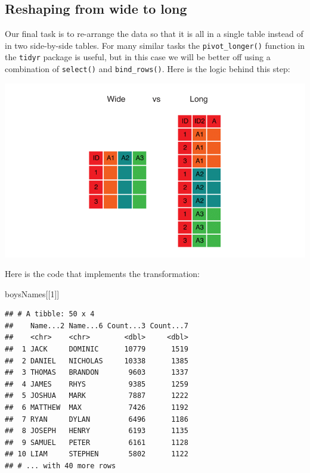 \documentclass[
]{book}
\newenvironment{Shaded}{\begin{snugshade}}{\end{snugshade}}
\newcommand{\DecValTok}[1]{\textcolor[rgb]{0.00,0.00,0.81}{#1}}
\newcommand{\NormalTok}[1]{#1}
\begin{document}
\hypertarget{reshaping-from-wide-to-long}{%
\subsection{Reshaping from wide to long}\label{reshaping-from-wide-to-long}}

Our final task is to re-arrange the data so that it is all in a single table instead of in two side-by-side tables. For many similar tasks the \texttt{pivot\_longer()} function in the \texttt{tidyr} package is useful, but in this case we will be better off using a combination of \texttt{select()} and \texttt{bind\_rows()}. Here is the logic behind this step:

\includegraphics{R/RDataWrangling/images/wide_vs_long.png}

Here is the code that implements the transformation:

\begin{Shaded}
\begin{Highlighting}[]
\NormalTok{boysNames[[}\DecValTok{1}\NormalTok{]]}
\end{Highlighting}
\end{Shaded}

\begin{verbatim}
## # A tibble: 50 x 4
##    Name...2 Name...6 Count...3 Count...7
##    <chr>    <chr>        <dbl>     <dbl>
##  1 JACK     DOMINIC      10779      1519
##  2 DANIEL   NICHOLAS     10338      1385
##  3 THOMAS   BRANDON       9603      1337
##  4 JAMES    RHYS          9385      1259
##  5 JOSHUA   MARK          7887      1222
##  6 MATTHEW  MAX           7426      1192
##  7 RYAN     DYLAN         6496      1186
##  8 JOSEPH   HENRY         6193      1135
##  9 SAMUEL   PETER         6161      1128
## 10 LIAM     STEPHEN       5802      1122
## # ... with 40 more rows
\end{verbatim}
\end{document}
